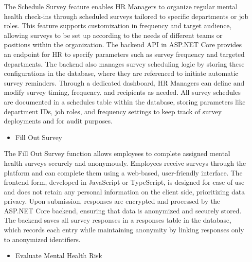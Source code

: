 \documentclass[conference]{IEEEtran}
\begin{document}
    The Schedule Survey feature enables HR Managers to organize 
    regular mental health check-ins through scheduled surveys 
    tailored to specific departments or job roles. This feature 
    supports customization in frequency and target audience, 
    allowing surveys to be set up according to the needs of 
    different teams or positions within the organization. The 
    backend API in ASP.NET Core provides an endpoint for HR to 
    specify parameters such as survey frequency and targeted 
    departments. The backend also manages survey scheduling 
    logic by storing these configurations in the database, where 
    they are referenced to initiate automatic survey reminders. 
    Through a dedicated dashboard, HR Managers can define and 
    modify survey timing, frequency, and recipients as needed. 
    All survey schedules are documented in a schedules table 
    within the database, storing parameters like department IDs, 
    job roles, and frequency settings to keep track of survey 
    deployments and for audit purposes.
    \newline
   
    \begin{itemize}
        \item Fill Out Survey 
    \end{itemize}

    The Fill Out Survey function allows employees to complete 
    assigned mental health surveys securely and anonymously. 
    Employees receive surveys through the platform and can complete 
    them using a web-based, user-friendly interface. The frontend 
    form, developed in JavaScript or TypeScript, is designed for 
    ease of use and does not retain any personal information on 
    the client side, prioritizing data privacy. Upon submission, 
    responses are encrypted and processed by the ASP.NET Core 
    backend, ensuring that data is anonymized and securely stored. 
    The backend saves all survey responses in a responses table in 
    the database, which records each entry while maintaining 
    anonymity by linking responses only to anonymized identifiers.
    \newline    

    \begin{itemize}
        \item Evaluate Mental Health Risk
    \end{itemize}
    
\end{document}
